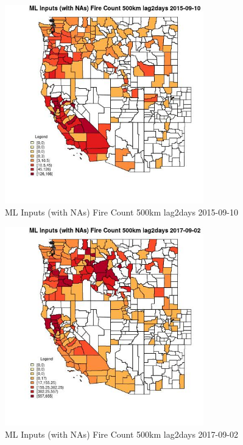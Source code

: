 \begin{figure} 
\centering  
\includegraphics[width=0.77\textwidth]{Code_Outputs/Report_ML_input_PM25_Step4_part_e_de_duplicated_aves_compiled_2019-05-20wNAs_CountyFire_Count_500km_lag2daysMean2015-09-10.jpg} 
\caption{\label{fig:Report_ML_input_PM25_Step4_part_e_de_duplicated_aves_compiled_2019-05-20wNAsCountyFire_Count_500km_lag2daysMean2015-09-10}ML Inputs (with NAs) Fire Count 500km lag2days 2015-09-10} 
\end{figure} 
 

\begin{figure} 
\centering  
\includegraphics[width=0.77\textwidth]{Code_Outputs/Report_ML_input_PM25_Step4_part_e_de_duplicated_aves_compiled_2019-05-20wNAs_CountyFire_Count_500km_lag2daysMean2017-09-02.jpg} 
\caption{\label{fig:Report_ML_input_PM25_Step4_part_e_de_duplicated_aves_compiled_2019-05-20wNAsCountyFire_Count_500km_lag2daysMean2017-09-02}ML Inputs (with NAs) Fire Count 500km lag2days 2017-09-02} 
\end{figure} 
 

